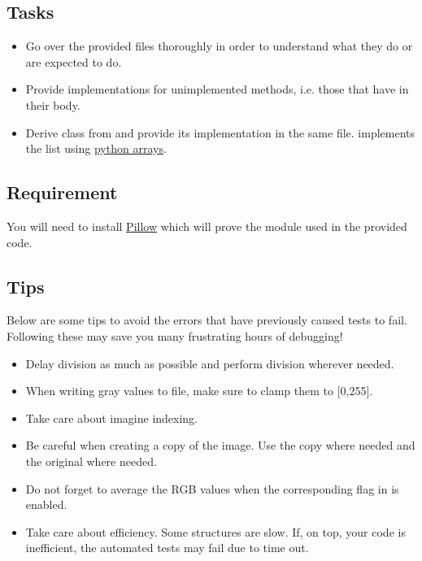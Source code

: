 \documentclass[addpoints]{exam}
\begin{document}
\subsection{Tasks}
\label{sec:tasks}

\begin{itemize}
  \item Go over the provided files thoroughly in order to understand what they do or are expected to do.
  \item Provide implementations for unimplemented methods, i.e. those that have  in their body.
  \item Derive  class  from  and provide its implementation in the same file.  implements the list using \href{https://www.programiz.com/python-programming/array}{python arrays}.
\end{itemize}

\subsection{Requirement}

You will need to install \href{https://pillow.readthedocs.io/en/5.3.x/index.html}{Pillow} which will prove the  module used in the provided code.

\subsection{Tips}

Below are some tips to avoid the errors that have previously caused tests to fail. Following these may save you many frustrating hours of debugging!
\begin{itemize}
  \item Delay division as much as possible and perform  division wherever needed.
  \item When writing gray values to file, make sure to clamp them to [0,255].
  \item Take care about imagine indexing.
  \item Be careful when creating a copy of the image. Use the copy where needed and the original where needed.
  \item Do not forget to average the RGB values when the corresponding flag in  is enabled.
  \item Take care about efficiency. Some structures are slow. If, on top, your code is inefficient, the automated tests may fail due to time out.
  
\end{itemize}
\end{document}
